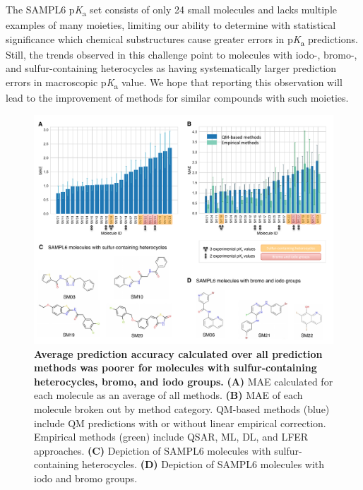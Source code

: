 \documentclass[9pt,lineno,final]{elife}
\newcommand{\pKa}{p\textit{K}\textsubscript{a}}
\begin{document}
The SAMPL6 \pKa{} set consists of only 24 small molecules and lacks multiple examples of many moieties, limiting our ability to determine with statistical significance which chemical substructures cause greater errors in \pKa{} predictions. 
Still, the trends observed in this challenge point to molecules with iodo-, bromo-, and sulfur-containing heterocycles as having systematically larger prediction errors in macroscopic \pKa{} value. 
We hope that reporting this observation will lead to the improvement of methods for similar compounds with such moieties. 





\begin{figure}
\centering
\includegraphics[width=1.0\linewidth]{figures/typeIII_molecular_MAE_fig.pdf}
\caption{{\bf Average prediction accuracy calculated over all prediction methods was poorer for molecules with sulfur-containing heterocycles, bromo, and iodo groups.}
{\bf(A)} MAE calculated for each molecule as an average of all methods. 
{\bf(B)} MAE of each molecule broken out by method category. QM-based methods (blue) include QM predictions with or without linear empirical correction. 
Empirical methods (green) include QSAR, ML, DL, and LFER approaches. 
{\bf(C)} Depiction of SAMPL6 molecules with sulfur-containing heterocycles. 
{\bf(D)} Depiction of SAMPL6 molecules with iodo and bromo groups.
}
\label{fig:typeIII_molecular_MAE}
\end{figure}
\end{document}
